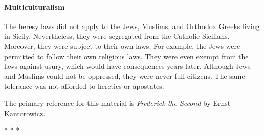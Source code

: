 \paragraph{Multiculturalism}
The heresy laws did not apply to the Jews, Muslims, and Orthodox Greeks living in Sicily. Nevertheless, they were segregated from the Catholic Sicilians. Moreover, they were subject to their own laws. For example, the Jews were permitted to follow their own religious laws. They were even exempt from the laws against usury, which would have consequences years later. Although Jews and Muslims could not be oppressed, they were never full citizens. The same tolerance was not afforded to heretics or apostates.

The primary reference for this material is \emph{Frederick the Second} by Ernst Kantorowicz.




\begin{center}* * *\end{center}

